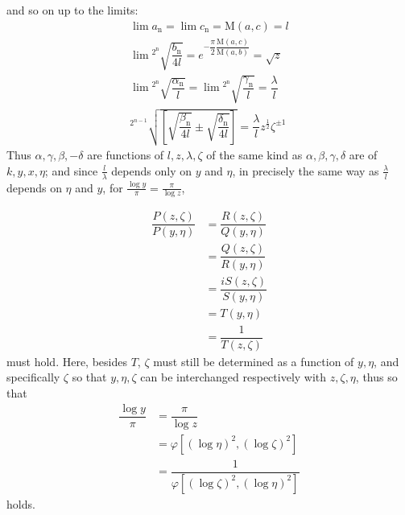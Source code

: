 and so on up to the limits:
\[
\begin{gathered}
\lim a_{\mathrm n}=\lim c_{\mathrm n}=\mathrm{M}(a,c)=l\\[7pt]
\lim{}^{2^{\mathrm n}}\!\surd {\dfrac{b_{\mathrm n}}{4l}}=e^{-\dfrac{\pi}{2}\dfrac{\mathrm{M}(a,c)}{\mathrm{M}(a,b)}}=\surd  z\\[7pt]
\lim{}^{2^{\mathrm n}}\!\surd {\dfrac{\alpha_{\mathrm n}}{l}}=\lim{}^{2^{\mathrm n}}\!\surd {\dfrac{\gamma_{\mathrm n}}{l}}=\dfrac{\lambda}{l}\\[7pt]
{}^{2^{n-1}}\!\surd {\left[\surd {\dfrac{\beta_{\mathrm n}}{4l}}\mathbin{\pm}\surd {\dfrac{\delta_{\mathrm n}}{4l}}\right]}=\dfrac{\lambda}{l}z^{\frac12}\zeta^{\pm1}
\end{gathered}
\]
Thus $\alpha,\allowbreak \gamma,\allowbreak \beta,\allowbreak -\delta$ are functions of $l,\allowbreak z,\allowbreak \lambda,\allowbreak \zeta$ of the same kind as $\alpha,\allowbreak \beta,\allowbreak \gamma,\allowbreak \delta$ are of $k,\allowbreak y,\allowbreak x,\allowbreak \eta$; and since $\frac{l}{\lambda}$ depends only on $y$ and $\eta$, in precisely the same way as $\frac{\lambda}{l}$ depends on $\eta$ and $y$, for $\frac{\log y}{\pi}=\frac{\pi}{\log z}$,


\[
\begin{aligned}\dfrac{P(z,\zeta)}{P(y,\eta)}&=\dfrac{R(z,\zeta)}{Q(y,\eta)}\\[7pt]&=\dfrac{Q(z,\zeta)}{R(y,\eta)}\\[7pt]&=\dfrac{iS(z,\zeta)}{S(y,\eta)}\\[7pt]&=T(y,\eta)\\[7pt]&=\dfrac{1}{T(z,\zeta)}\end{aligned}
\]
must hold. Here, besides $T$, $\zeta$ must still be determined as a function of $y,\allowbreak \eta$, and specifically $\zeta$ so that $y,\allowbreak \eta,\allowbreak \zeta$ can be interchanged respectively with $z,\allowbreak \zeta,\allowbreak \eta$, thus so that
\[
\begin{aligned}\dfrac{\log y}{\pi}&=\dfrac{\pi}{\log z}\\[7pt]&=\varphi[(\log\eta)^2,(\log\zeta)^2]\\[7pt]&=\dfrac{1}{\varphi[(\log\zeta)^2,(\log\eta)^2]}\end{aligned}
\]
holds.

